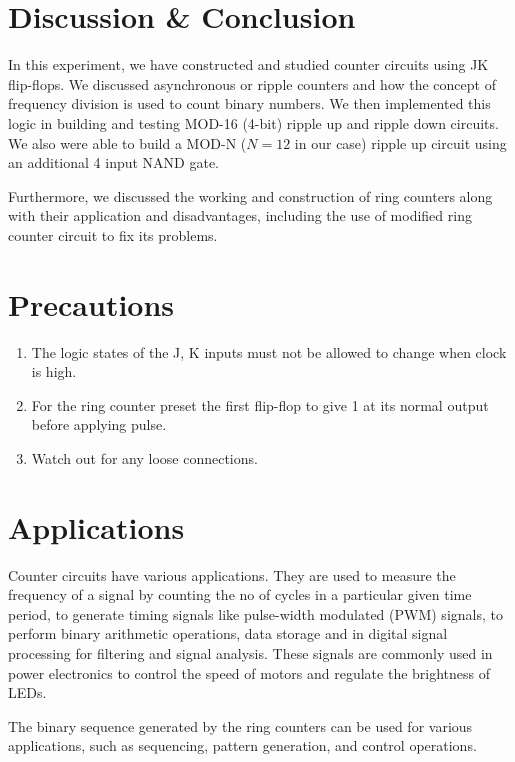 \section{Discussion \& Conclusion}
In this experiment, we have constructed and studied counter circuits using JK flip-flops. We discussed asynchronous or ripple counters and how the concept of frequency division is used to count binary numbers. We then implemented this logic in building and testing MOD-16 (4-bit) ripple up and ripple down circuits. We also were able to build a MOD-N ($N=12$ in our case) ripple up circuit using an additional 4 input NAND gate.

Furthermore, we discussed the working and construction of ring counters along with their application and disadvantages, including the use of modified ring counter circuit to fix its problems.


\section{Precautions}

\begin{enumerate}
    \item The logic states of the J, K inputs must not be allowed to change when clock is high.
    \item For the ring counter preset the first flip-flop to give 1 at its normal output before applying pulse.
    \item Watch out for any loose connections.
\end{enumerate}

\section{Applications}
Counter circuits have various applications. They are used to measure the frequency of a signal by counting the no of cycles in a particular given time period, to generate timing signals like pulse-width modulated (PWM) signals, to perform binary arithmetic operations, data storage and in digital signal processing for filtering and signal analysis. These signals are commonly used in power electronics to control the speed of motors and regulate the brightness of LEDs.

The binary sequence generated by the ring counters can be used for various applications, such as sequencing, pattern generation, and control operations.